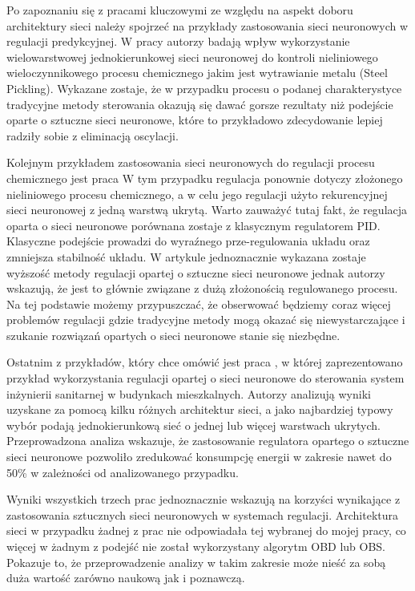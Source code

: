 \par Po zapoznaniu się z pracami kluczowymi ze względu na aspekt doboru architektury sieci należy spojrzeć na przykłady zastosowania sieci neuronowych w regulacji predykcyjnej. W pracy \cite{kiti2009} autorzy badają wpływ wykorzystanie wielowarstwowej jednokierunkowej sieci neuronowej do kontroli nieliniowego wieloczynnikowego procesu chemicznego jakim jest wytrawianie metalu (Steel Pickling). Wykazane zostaje, że w przypadku procesu o podanej charakterystyce tradycyjne metody sterowania okazują się dawać gorsze rezultaty niż podejście oparte o sztuczne sieci neuronowe, które to przykładowo zdecydowanie lepiej radziły sobie z eliminacją oscylacji. 
\par Kolejnym przykładem zastosowania sieci neuronowych do regulacji procesu chemicznego jest praca \cite{hosen2011} W tym przypadku regulacja ponownie dotyczy złożonego nieliniowego procesu chemicznego, a w celu jego regulacji użyto rekurencyjnej sieci neuronowej z jedną warstwą ukrytą. Warto zauważyć tutaj fakt, że regulacja oparta o sieci neuronowe porównana zostaje z klasycznym regulatorem PID. Klasyczne podejście prowadzi do wyraźnego prze-regulowania  układu oraz zmniejsza stabilność układu. W artykule jednoznacznie wykazana zostaje wyższość metody regulacji opartej o sztuczne sieci
neuronowe jednak autorzy wskazują, że jest to głównie związane z dużą złożonością regulowanego procesu. Na tej podstawie możemy przypuszczać, że obserwować będziemy coraz więcej problemów regulacji gdzie tradycyjne metody mogą okazać się niewystarczające i szukanie rozwiązań opartych o sieci neuronowe stanie się niezbędne. 
\par Ostatnim z przykładów, który chce omówić jest praca \cite{afram2017}, w której zaprezentowano przykład wykorzystania regulacji opartej o sieci neuronowe do sterowania system inżynierii sanitarnej w budynkach mieszkalnych. Autorzy analizują wyniki uzyskane za pomocą kilku różnych architektur sieci, a jako najbardziej typowy wybór podają jednokierunkową sieć o jednej lub więcej warstwach ukrytych. Przeprowadzona analiza wskazuje, że zastosowanie regulatora opartego o sztuczne sieci neuronowe pozwoliło zredukować konsumpcję energii w zakresie nawet do 50\% w zależności od analizowanego przypadku.

\par Wyniki wszystkich trzech prac jednoznacznie wskazują na korzyści wynikające z zastosowania sztucznych sieci neuronowych w systemach regulacji. Architektura sieci w przypadku żadnej z prac nie odpowiadała tej wybranej do mojej pracy, co więcej w żadnym z podejść nie został wykorzystany algorytm OBD lub OBS. Pokazuje to, że przeprowadzenie analizy w takim zakresie może nieść za sobą duża wartość zarówno naukową jak i poznawczą. 


